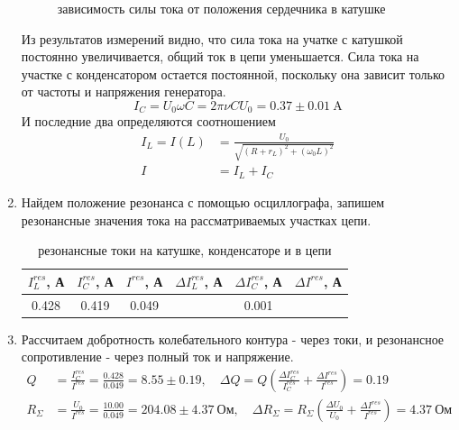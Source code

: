 \documentclass[a4paper, 12pt]{article}
\begin{document}
\begin{enumerate}
\begin{figure}[htbp]
        \label{зависимость сил тока для разных расстояний}
        \caption{зависимость силы тока от положения сердечника в катушке}
    \end{figure}\newline
    Из результатов измерений видно, что сила тока на учатке с катушкой постоянно увеличивается, общий ток в цепи уменьшается. Сила тока 
    на участке с конденсатором остается постоянной, поскольку она зависит только от частоты и напряжения генератора.
    \begin{equation}
        I_{C} = U_{0} \omega C = 2\pi \nu C U_{0} = 0.37\pm 0.01\ \text{A}
        \label{ток на участке с конденсатором}
    \end{equation}
    И последние два определяются соотношением
    \begin{align}
        I_{L} = I(L) &= \frac{U_{0}}{\sqrt{(R + r_{L})^{2} + (\omega_{0}L)^{2}}}\\
        I &= I_{L} + I_{C}
    \end{align}
    \item Найдем положение резонанса с помощью осциллографа, запишем резонансные значения тока на рассматриваемых участках цепи.
    \begin{table}[htbp]
        \centering
        \begin{tabular}{|c|c|c|c|c|c|}
            \hline
            $I^{res}_{L}$, А & $I^{res}_{C}$, А & $I^{res}$, А & $\Delta I^{res}_{L}$, А & $\Delta I^{res}_{C}$, А & $\Delta I^{res}$, А\\
            \hline
            0.428 & 0.419 & 0.049 & \multicolumn{3}{|c|}{0.001}\\
            \hline
        \end{tabular}
        \caption{резонансные токи на катушке, конденсаторе и в цепи}
        \label{резонансные токи на катушке, конденсаторе и в цепи}
    \end{table}
    \item Рассчитаем добротность колебательного контура - через токи, и резонансное сопротивление - через полный ток и напряжение.
    \begin{align}
        Q &= \frac{I^{res}_{C}}{I^{res}} = \frac{0.428}{0.049} = 8.55 \pm 0.19, \quad \Delta Q = Q\left(\frac{\Delta I^{res}_{C}}{I^{res}_{C}} + \frac{\Delta I^{res}}{I^{res}}\right) = 0.19\\
        R_{\Sigma} &= \frac{U_{0}}{I^{res}} = \frac{10.00}{0.049} = 204.08 \pm 4.37\ \text{Ом}, \quad \Delta R_{\Sigma} = R_{\Sigma}\left(\frac{\Delta U_{0}}{U_{0}} + \frac{\Delta I^{res}}{I^{res}}\right) = 4.37\ \text{Ом}

\end{align}
\end{enumerate}
\end{document}
